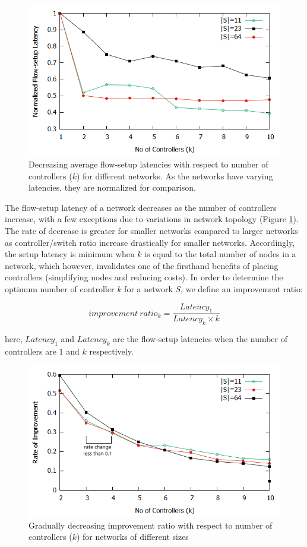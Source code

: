 \documentclass[journal]{IEEEtran}
\begin{document}
\begin{figure}
	\centering
	\includegraphics[width=\linewidth]{Images/k_vs_l.png}
	\caption{Decreasing average flow-setup latencies with respect to number of controllers ($k$) for different networks. As the networks have varying latencies, they are normalized for comparison.} \label{fig:KvsL}
\end{figure}

The flow-setup latency of a network decreases as the number of controllers increase, with a few exceptions due to variations in network topology (Figure \ref{fig:KvsL}). The rate of decrease is greater for smaller networks compared to larger networks as controller/switch ratio increase drastically for smaller networks. Accordingly, the setup latency is minimum when $k$ is equal to the total number of nodes in a network, which however, invalidates one of the firsthand benefits of placing controllers (simplifying nodes and reducing costs). In order to determine the optimum number of controller $k$ for a network $S$, we define an improvement ratio:

\begin{equation}
improvement~ratio_k = \frac{Latency_1}{Latency_k\times k}
\end{equation}

here, $Latency_1$ and $Latency_k$ are the flow-setup latencies when the number of controllers are 1 and $k$ respectively.

\begin{figure}
	\centering
	\includegraphics[width=\linewidth]{Images/cutoff.png}
	\caption{Gradually decreasing improvement ratio with respect to number of controllers ($k$) for networks of different sizes} \label{fig:cutoff}
\end{figure}
\end{document}
